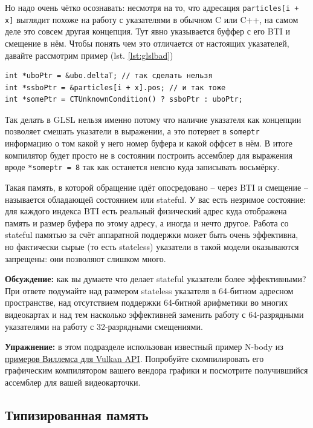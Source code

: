 \documentclass[a4paper,12pt,oneside]{article}
\begin{document}
Но надо очень чётко осознавать: несмотря на то, что адресация \lstinline!particles[i + x]! выглядит похоже на работу с указателями в обычном C или C++, на самом деле это совсем другая концепция. Тут явно указывается буффер с его BTI и смещение в нём. Чтобы понять чем это отличается от настоящих указателей, давайте рассмотрим пример (lst. \ref{lst:glslbad})

\begin{lstlisting}[caption={Отсутствие настоящих указателей в GLSL},label={lst:glslbad}]
int *uboPtr = &ubo.deltaT; // так сделать нельзя
int *ssboPtr = &particles[i + x].pos; // и так тоже
int *somePtr = CTUnknownCondition() ? ssboPtr : uboPtr;
\end{lstlisting}

Так делать в GLSL нельзя именно потому что наличие указателя как концепции позволяет смешать указатели в выражении, а это потеряет в \lstinline!someptr! информацию о том какой у него номер буфера и какой оффсет в нём.
В итоге компилятор будет просто не в состоянии построить ассемблер для выражения вроде \lstinline!*someptr = 8! так как останется неясно куда записывать восьмёрку.

Такая память, в которой обращение идёт опосредовано -- через BTI и смещение -- называется обладающей состоянием или stateful.
У вас есть незримое состояние: для каждого индекса BTI есть реальный физический адрес куда отображена память и размер буфера по этому адресу, а иногда и нечто другое.
Работа со stateful памятью за счёт аппаратной поддержки может быть очень эффективна, но фактически сырые (то есть stateless) указатели в такой модели оказываются запрещены: они позволяют слишком много.

\textbf{Обсуждение:} как вы думаете что делает stateful указатели более эффективными?
При ответе подумайте над размером stateless указателя в 64-битном адресном пространстве, над отсутствием поддержки 64-битной арифметики во многих видеокартах и над тем насколько эффективней заменить работу с 64-разрядными указателями на работу с 32-разрядными смещениями.

\textbf{Упражнение:} в этом подразделе использован известный пример N-body из
\href{https://github.com/SaschaWillems/Vulkan/blob/master/data/shaders/glsl/computenbody/particle_calculate.comp}{примеров Виллемса для Vulkan API}. Попробуйте скомпилировать его графическим компилятором вашего вендора графики и посмотрите получившийся ассемблер для вашей видеокарточки.

\subsection{Типизированная память}\label{subsec:typedmem}
\end{document}
